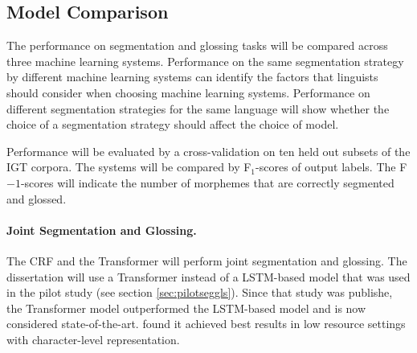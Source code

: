 \subsection{Model Comparison}

The performance on segmentation and glossing tasks will be compared across three machine learning systems.  Performance on the same segmentation strategy by different machine learning systems can identify the factors that linguists should consider when choosing machine learning systems. Performance on different segmentation strategies for the same language will show whether the choice of a segmentation strategy should affect the choice of model.  

Performance will be evaluated by a cross-validation on ten held out subsets of the IGT corpora. The systems will be compared by F$_1$-scores of output labels. 
The F$-1$-scores will indicate the number of morphemes that are correctly segmented and glossed. %

\paragraph{Joint Segmentation and Glossing.}
The CRF and the Transformer will perform joint segmentation and glossing. The dissertation will use a Transformer instead of a LSTM-based model that was used in the pilot study (see section \ref{sec:pilotseggls}). Since that study was publishe, the Transformer model outperformed the LSTM-based model and is now considered state-of-the-art. \cite{wu2020applying} found it achieved best results in low resource settings with character-level representation. 


